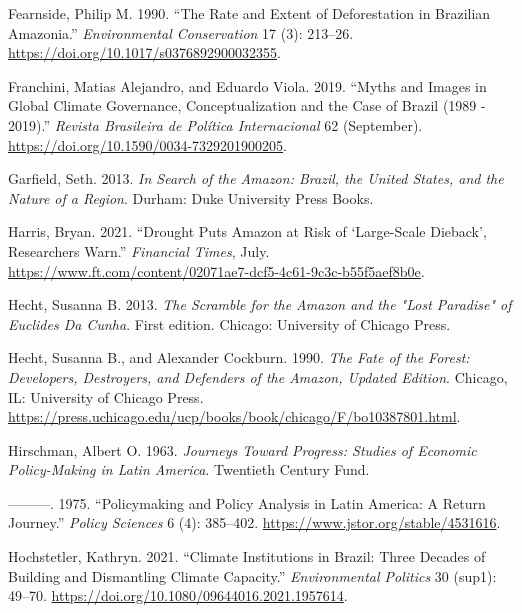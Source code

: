 \documentclass[
]{article}
\newlength{\cslhangindent}
\newlength{\cslentryspacingunit} %
\newenvironment{CSLReferences}[2] %
 {%
  \setlength{\parindent}{0pt}
  \ifodd #1
  \let\oldpar\par
  \def\par{\hangindent=\cslhangindent\oldpar}
  \fi
  \setlength{\parskip}{#2\cslentryspacingunit}
 }%
 {}
\begin{document}
\begin{CSLReferences}{1}{0}
\leavevmode{}%
Fearnside, Philip M. 1990. {``The Rate and Extent of Deforestation in
Brazilian Amazonia.''} \emph{Environmental Conservation} 17 (3):
213--26. \url{https://doi.org/10.1017/s0376892900032355}.

\leavevmode{}%
Franchini, Matias Alejandro, and Eduardo Viola. 2019. {``Myths and
Images in Global Climate Governance, Conceptualization and the Case of
Brazil (1989 - 2019).''} \emph{Revista Brasileira de Política
Internacional} 62 (September).
\url{https://doi.org/10.1590/0034-7329201900205}.

\leavevmode{}%
Garfield, Seth. 2013. \emph{In Search of the Amazon: Brazil, the United
States, and the Nature of a Region}. Durham: Duke University Press
Books.

\leavevmode{}%
Harris, Bryan. 2021. {``Drought Puts Amazon at Risk of {`}Large-Scale
Dieback{'}, Researchers Warn.''} \emph{Financial Times}, July.
\url{https://www.ft.com/content/02071ae7-dcf5-4c61-9c3c-b55f5aef8b0e}.

\leavevmode{}%
Hecht, Susanna B. 2013. \emph{The Scramble for the Amazon and the
{"}Lost Paradise{"} of Euclides Da Cunha}. First edition. Chicago:
University of Chicago Press.

\leavevmode{}%
Hecht, Susanna B., and Alexander Cockburn. 1990. \emph{The Fate of the
Forest: Developers, Destroyers, and Defenders of the Amazon, Updated
Edition}. Chicago, IL: University of Chicago Press.
\url{https://press.uchicago.edu/ucp/books/book/chicago/F/bo10387801.html}.

\leavevmode{}%
Hirschman, Albert O. 1963. \emph{Journeys Toward Progress: Studies of
Economic Policy-Making in Latin America}. Twentieth Century Fund.

\leavevmode{}%
---------. 1975. {``Policymaking and Policy Analysis in Latin America: A
Return Journey.''} \emph{Policy Sciences} 6 (4): 385--402.
\url{https://www.jstor.org/stable/4531616}.

\leavevmode{}%
Hochstetler, Kathryn. 2021. {``Climate Institutions in Brazil: Three
Decades of Building and Dismantling Climate Capacity.''}
\emph{Environmental Politics} 30 (sup1): 49--70.
\url{https://doi.org/10.1080/09644016.2021.1957614}.


\end{CSLReferences}
\end{document}
